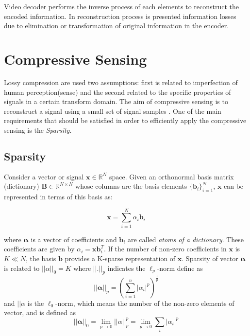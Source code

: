 Video decoder performs the inverse process of each elements to reconstruct the encoded information. In reconstruction process is presented information losses due to elimination or transformation of original information in the encoder.

\section{Compressive Sensing}

Lossy compression are used two assumptions: first is related to imperfection of human perception(sense) and the second related to the specific properties of signals in a certain transform domain. The aim of compressive sensing is to reconstruct a signal using a small set of signal samples \cite{compressive}. One of the main requirements that should be satisfied in order to efficiently apply the compressive sensing is the \emph{Sparsity}.

\subsection{Sparsity}

Consider a vector or signal $\boldsymbol{x} \in \mathbb{R}^N$ space. Given an orthonormal basis matrix (dictionary) $\boldsymbol{B} \in \mathbb{R}^{N \times N}$ whose columns are the basis elements $ \{\boldsymbol{b}_i\}_{i=1}^N$, $\boldsymbol{x}$ can be represented in terms of this basis as:
\begin{center}
\begin{equation}
\boldsymbol{x}=\sum \limits_{i=1}^{N} \alpha_i \boldsymbol{b}_i
\end{equation}
\end{center}
where $\boldsymbol{\alpha}$ is a vector of coefficients \cite{sparsity} and $\boldsymbol{b}_i$ are called \emph{atoms of a dictionary}. These coefficients are given by $\alpha_i = \boldsymbol{x} \boldsymbol{b}_i^T$. If the number of non-zero coefficients in $\boldsymbol{x}$ is $K\ll N$, the basis $\boldsymbol{b}$ provides a K-sparse representation of $\boldsymbol{x}$. Sparsity of vector $\boldsymbol{\alpha}$ is related
to $||\alpha||_0 = K$ where $||.||_p$ indicates the $\ell_p$-norm define as
\begin{equation}
||\boldsymbol{\alpha}||_p = \left(\sum\limits_{i=1}^{n} |\alpha_i|^p \right)^\frac{1}{p}
\end{equation}
and $||\alpha$ is the $\ell_0$-norm, which means the number of the non-zero elements of vector, and is defined  as
\begin{equation}
||\boldsymbol{\alpha}||_0 = \lim_{p \to 0} ||\alpha||_p^p=\lim_{p \to 0} \sum_i |\alpha_i|^p
\end{equation} 


